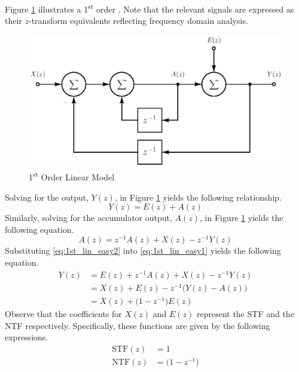 Figure \ref{fig:linear_z_model_1} illustrates a 1\textsuperscript{st} order \dt \DSm.
Note that the relevant signals are expressed as their $z$-transform equivalents
reflecting frequency domain analysis.
\begin{figure}[htbp]
 \centering
 \includegraphics{./final_figures/first_order_simple.eps}
 \caption{1\textsuperscript{st} Order Linear Model}
 \label{fig:linear_z_model_1}
\end{figure}
Solving for the output, $Y(z)$, in Figure \ref{fig:linear_z_model_1} yields the
following
relationship.
\begin{equation}\label{eq:1st_lin_easy1}
 Y(z)=E(z)+A(z)
\end{equation}
Similarly, solving for the accumulator output, $A(z)$, in Figure
\ref{fig:linear_z_model_1} yields the following
equation.
\begin{equation}\label{eq:1st_lin_easy2}
 A(z)=z^{-1}A(z)+X(z)-z^{-1}Y(z)
\end{equation}
Substituting \eqref{eq:1st_lin_easy2} into \eqref{eq:1st_lin_easy1} yields the following
equation.
\begin{equation}\label{eq:1st_lin_easy3}
 \begin{split}
  Y(z) &= E(z)+z^{-1}A(z)+X(z)-z^{-1}Y(z)\\
       &= X(z)+E(z)-z^{-1}\bigl(Y(z)-A(z)\bigr)\\
       &= X(z)+\bigl(1-z^{-1}\bigr)E(z)
 \end{split}
\end{equation}
Observe that the coefficients for $X(z)$ and $E(z)$ represent the STF and the NTF
respectively. Specifically, these functions are given by the following expressions.
\begin{equation}\label{eq:first_order_STF_NTF}
  \begin{split} 
   \textrm{STF}(z)&=1\\
   \textrm{NTF}(z)&=\bigl(1-z^{-1}\bigr)
  \end{split}
\end{equation}
